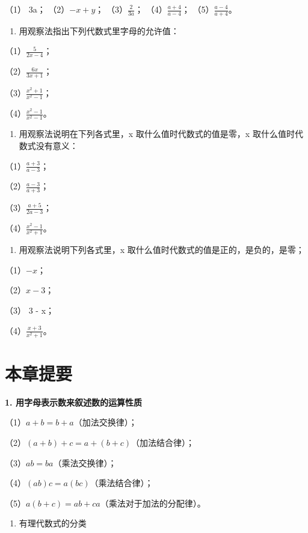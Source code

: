 （1） 3a； （2）\(-x + y\)； （3）\(\frac{2}{3a}\)；
（4）\(\frac{a + 4}{a - 4}\)； （5）\(\frac{a - 4}{a + 4}\)。

\begin{enumerate}[start=2]
\item
  用观察法指出下列代数式里字母的允许值：
\end{enumerate}

（1）\(\frac{5}{2x - 4}\)；

（2）\(\frac{6x}{3x + 1}\)；

（3）\(\frac{x^2 + 1}{x^2 - 1}\)；

（4）\(\frac{x^2 - 1}{x^2 - 1}\)。

\begin{enumerate}[start=3]
\item
  用观察法说明在下列各式里，x 取什么值时代数式的值是零，x
  取什么值时代数式没有意义：
\end{enumerate}

（1）\(\frac{a + 3}{a - 3}\)；

（2）\(\frac{a - 3}{a + 3}\)；

（3）\(\frac{a + 5}{2a - 3}\)；

（4）\(\frac{x^2 - 1}{x^2 + 1}\)。

\begin{enumerate}[start=4]
\item
  用观察法说明下列各式里，x 取什么值时代数式的值是正的，是负的，是零；
\end{enumerate}

（1）\(-x\)；

（2）\(x - 3\)；

（3） 3 - x；

（4）\(\frac{x + 3}{x^2 + 1}\)。

\section{本章提要}

\textbf{1. 用字母表示数来叙述数的运算性质}

（1）\(a + b = b + a\)（加法交换律）；

（2）\((a + b) + c = a + (b + c)\)（加法结合律）；

（3）\(ab = ba\)（乘法交换律）；

（4）\((ab)c = a(bc)\)（乘法结合律）；

（5）\(a(b + c) = ab + ca\)（乘法对于加法的分配律）。

\begin{enumerate}[start=2]
\item
  有理代数式的分类
\end{enumerate}

